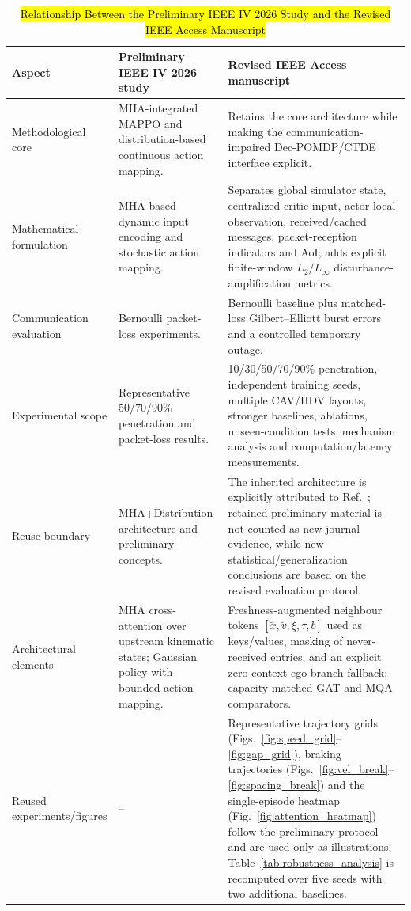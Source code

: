 \documentclass{ieeeaccess}
\begin{document}
\begin{table}[htbp]
\centering
\caption{\hl{Relationship Between the Preliminary IEEE IV 2026 Study and the Revised IEEE Access Manuscript}}
\label{tab:iv_access_novelty}
\renewcommand{\arraystretch}{1.15}
\begin{tabularx}{\textwidth}{|p{3.1cm}|X|X|}
\hline
\rowcolor{yellow}\textbf{Aspect} & \textbf{Preliminary IEEE IV 2026 study} & \textbf{Revised IEEE Access manuscript} \\ \hline
\rowcolor{yellow}Methodological core & MHA-integrated MAPPO and distribution-based continuous action mapping. & Retains the core architecture while making the communication-impaired Dec-POMDP/CTDE interface explicit. \\ \hline
\rowcolor{yellow}Mathematical formulation & MHA-based dynamic input encoding and stochastic action mapping. & Separates global simulator state, centralized critic input, actor-local observation, received/cached messages, packet-reception indicators and AoI; adds explicit finite-window $L_2/L_\infty$ disturbance-amplification metrics. \\ \hline
\rowcolor{yellow}Communication evaluation & Bernoulli packet-loss experiments. & Bernoulli baseline plus matched-loss Gilbert--Elliott burst errors and a controlled temporary outage. \\ \hline
\rowcolor{yellow}Experimental scope & Representative 50/70/90\% penetration and packet-loss results. & 10/30/50/70/90\% penetration, independent training seeds, multiple CAV/HDV layouts, stronger baselines, ablations, unseen-condition tests, mechanism analysis and computation/latency measurements. \\ \hline
\rowcolor{yellow}Reuse boundary & MHA+Distribution architecture and preliminary concepts. & The inherited architecture is explicitly attributed to Ref.~\cite{cai2026integrating}; retained preliminary material is not counted as new journal evidence, while new statistical/generalization conclusions are based on the revised evaluation protocol. \\ \hline
\rowcolor{yellow}Architectural elements & MHA cross-attention over upstream kinematic states; Gaussian policy with bounded action mapping. & Freshness-augmented neighbour tokens $[\tilde x,\tilde v,\xi,\tau,b]$ used as keys/values, masking of never-received entries, and an explicit zero-context ego-branch fallback; capacity-matched GAT and MQA comparators. \\ \hline
\rowcolor{yellow}Reused experiments/figures & -- & Representative trajectory grids (Figs.~\ref{fig:speed_grid}--\ref{fig:gap_grid}), braking trajectories (Figs.~\ref{fig:vel_break}--\ref{fig:spacing_break}) and the single-episode heatmap (Fig.~\ref{fig:attention_heatmap}) follow the preliminary protocol and are used only as illustrations; Table~\ref{tab:robustness_analysis} is recomputed over five seeds with two additional baselines. \\ \hline %

\end{tabularx}
\end{table}
\end{document}
